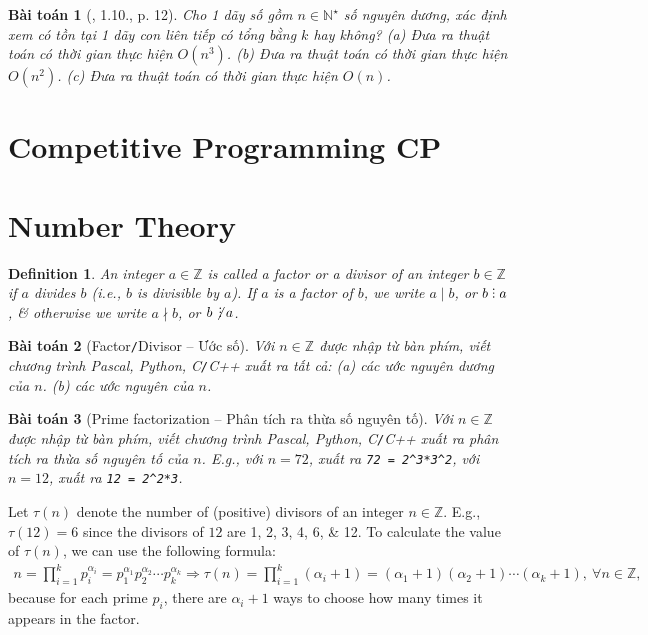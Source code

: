 \documentclass{article}
\newtheorem{baitoan}{Bài toán}
\newtheorem{definition}{Definition}
\DeclareRobustCommand{\divby}{%
	\mathrel{\vbox{\baselineskip.65ex\lineskiplimit0pt\hbox{.}\hbox{.}\hbox{.}}}%
}
\begin{document}
\begin{baitoan}[\cite{TLGK_chuyen_Tin_quyen_1}, 1.10., p. 12]
	Cho 1 dãy số gồm $n\in\mathbb{N}^\star$ số nguyên dương, xác định xem có tồn tại 1 dãy con liên tiếp có tổng bằng $k$ hay không? (a) Đưa ra thuật toán có thời gian thực hiện $O(n^3)$. (b) Đưa ra thuật toán có thời gian thực hiện $O(n^2)$. (c) Đưa ra thuật toán có thời gian thực hiện $O(n)$.
\end{baitoan}


\section{Competitive Programming CP}


\section{Number Theory}

\begin{definition}
	An integer $a\in\mathbb{Z}$ is called a \emph{factor} or a \emph{divisor} of an integer $b\in\mathbb{Z}$ if $a$ divides $b$ (i.e., $b$ is divisible by $a$). If $a$ is a factor of $b$, we write $a\mid b$, or $b\divby a$, \& otherwise we write $a\nmid b$, or $b\not\,\divby a$.
\end{definition}

\begin{baitoan}[Factor\texttt{/}Divisor -- Ước số]
	Với $n\in\mathbb{Z}$ được nhập từ bàn phím, viết chương trình {\sf Pascal, Python, C\texttt{/}C++} xuất ra tất cả: (a) các ước nguyên dương của $n$. (b) các ước nguyên của $n$.
\end{baitoan}

\begin{baitoan}[Prime factorization -- Phân tích ra thừa số nguyên tố]
	Với $n\in\mathbb{Z}$ được nhập từ bàn phím, viết chương trình {\sf Pascal, Python, C\texttt{/}C++} xuất ra phân tích ra thừa số nguyên tố của $n$. E.g., với $n = 72$, xuất ra \verb|72 = 2^3*3^2|, với $n = 12$, xuất ra \verb|12 = 2^2*3|.
\end{baitoan}
Let $\tau(n)$ denote the number of (positive) divisors of an integer $n\in\mathbb{Z}$. E.g., $\tau(12) = 6$ since the divisors of $12$ are 1, 2, 3, 4, 6, \& 12. To calculate the value of $\tau(n)$, we can use the following formula:
\begin{align*}
	n = \prod_{i=1}^k p_i^{\alpha_i} = p_1^{\alpha_1}p_2^{\alpha_2}\cdots p_k^{\alpha_k}\Rightarrow\tau(n) = \prod_{i=1}^k (\alpha_i + 1) = (\alpha_1 + 1)(\alpha_2 + 1)\cdots(\alpha_k + 1),\ \forall n\in\mathbb{Z},
\end{align*}
because for each prime $p_i$, there are $\alpha_i + 1$ ways to choose how many times it appears in the factor.
\end{document}
